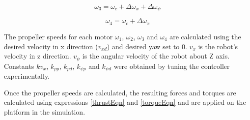 \documentclass[12pt,a4paper]{report}
\begin{document}
\begin{equation}
\label{control2w3}
\omega_{3} = \omega_{c} + \Delta\omega_{x} + \Delta\omega_{\psi}
\end{equation}

\begin{equation}
\label{control2w4}
\omega_{4} = \omega_{c} + \Delta\omega_{x}
\end{equation}

The propeller speeds for each motor \(\omega_{1}\), \(\omega_{2}\), \(\omega_{3}\) and \(\omega_{4}\) are calculated using the desired velocity in x direction (\(v_{xd}\)) and desired yaw set to 0. \(v_{x}\) is the robot's velocity in z direction. \(v_{\psi}\) is the angular velocity of the robot about Z axis. Constants \(kv_{x}\), \(k_{pp}\), \(k_{pd}\), \(k_{\psi p}\) and \(k_{\psi d}\) were obtained by tuning the controller experimentally.\par

Once the propeller speeds are calculated, the resulting forces and torques are calculated using expressions \ref{thrustEqn} and \ref{torqueEqn} and are applied on the platform in the simulation.



\end{document}
